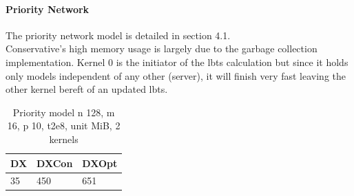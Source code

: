 \paragraph*{Priority Network}
The priority network model is detailed in section 4.1.\\
Conservative's high memory usage is largely due to the garbage collection implementation. Kernel 0 is the initiator of the lbts calculation but since it holds only models independent of any other (server), it will finish very fast leaving the other kernel bereft of an updated lbts.
\begin{table}[lhtb]
	\centering
	\caption{Priority model n 128, m 16, p 10,  t2e8, unit MiB, 2 kernels}
	\label{pmod_mem}
	\begin{tabular}{| l | l | l |}
		\hline
		DX &DXCon &DXOpt\\ \hline
		35 & 450 & 651\\ \hline
	\end{tabular}
\end{table}
